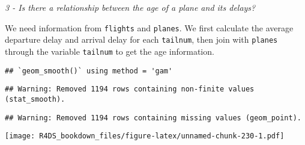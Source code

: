 \documentclass[]{article}
\newenvironment{Shaded}{\begin{snugshade}}{\end{snugshade}}
\newcommand{\KeywordTok}[1]{\textcolor[rgb]{0.13,0.29,0.53}{\textbf{#1}}}
\newcommand{\DataTypeTok}[1]{\textcolor[rgb]{0.13,0.29,0.53}{#1}}
\newcommand{\DecValTok}[1]{\textcolor[rgb]{0.00,0.00,0.81}{#1}}
\newcommand{\StringTok}[1]{\textcolor[rgb]{0.31,0.60,0.02}{#1}}
\newcommand{\OtherTok}[1]{\textcolor[rgb]{0.56,0.35,0.01}{#1}}
\newcommand{\OperatorTok}[1]{\textcolor[rgb]{0.81,0.36,0.00}{\textbf{#1}}}
\newcommand{\NormalTok}[1]{#1}
\theoremstyle{definition}
\theoremstyle{definition}
\theoremstyle{definition}
\theoremstyle{remark}
\begin{document}
\emph{3 - Is there a relationship between the age of a plane and its
delays?}

We need information from \texttt{flights} and \texttt{planes}. We first
calculate the average departure delay and arrival delay for each
\texttt{tailnum}, then join with \texttt{planes} through the variable
\texttt{tailnum} to get the age information.

\begin{Shaded}
\end{Shaded}

\begin{verbatim}
## `geom_smooth()` using method = 'gam'
\end{verbatim}

\begin{verbatim}
## Warning: Removed 1194 rows containing non-finite values (stat_smooth).
\end{verbatim}

\begin{verbatim}
## Warning: Removed 1194 rows containing missing values (geom_point).
\end{verbatim}

\texttt{[image: R4DS\_bookdown\_files/figure-latex/unnamed-chunk-230-1.pdf]}
\end{document}
